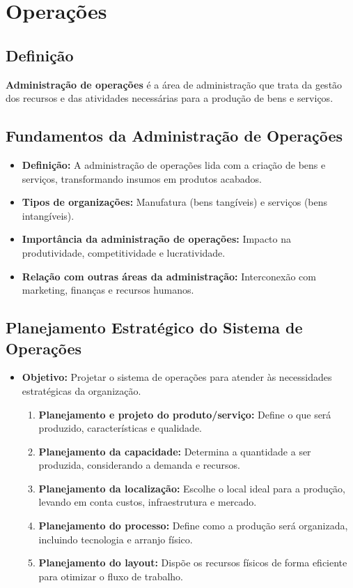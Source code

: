 \documentclass{article}
\begin{document}
\section{Operações}

\subsection{Definição}
\textbf{Administração de operações} é a área de administração que trata da gestão dos recursos e das atividades necessárias para a produção de bens e serviços.

\subsection{Fundamentos da Administração de Operações}
\begin{itemize}
    \item \textbf{Definição:} A administração de operações lida com a criação de bens e serviços, transformando insumos em produtos acabados. 
    \item \textbf{Tipos de organizações:} Manufatura (bens tangíveis) e serviços (bens intangíveis). 
    \item \textbf{Importância da administração de operações:} Impacto na produtividade, competitividade e lucratividade. 
    \item \textbf{Relação com outras áreas da administração:} Interconexão com marketing, finanças e recursos humanos. 
\end{itemize}

\subsection{Planejamento Estratégico do Sistema de Operações}
\begin{itemize}
    \item \textbf{Objetivo:} Projetar o sistema de operações para atender às necessidades estratégicas da organização. 
    \begin{enumerate}[label=\textbullet]
        \item \textbf{Planejamento e projeto do produto/serviço:} Define o que será produzido, características e qualidade.
        \item \textbf{Planejamento da capacidade:} Determina a quantidade a ser produzida, considerando a demanda e recursos.
        \item \textbf{Planejamento da localização:} Escolhe o local ideal para a produção, levando em conta custos, infraestrutura e mercado.
        \item \textbf{Planejamento do processo:} Define como a produção será organizada, incluindo tecnologia e arranjo físico.
        \item \textbf{Planejamento do layout:} Dispõe os recursos físicos de forma eficiente para otimizar o fluxo de trabalho.
    \end{enumerate}
\end{itemize}
\end{document}
